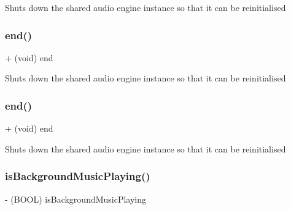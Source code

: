 Shuts down the shared audio engine instance so that it can be reinitialised \mbox{\label{interfaceSimpleAudioEngine_a2750af49fe41ee3fcf3d544f05ef3c73}} 
\subsubsection{\texorpdfstring{end()}{end()}\hspace{0.1cm}{\footnotesize\ttfamily [3/4]}}
{\footnotesize\ttfamily + (void) end \begin{DoxyParamCaption}{ }\end{DoxyParamCaption}}

Shuts down the shared audio engine instance so that it can be reinitialised \mbox{\label{interfaceSimpleAudioEngine_a2750af49fe41ee3fcf3d544f05ef3c73}} 
\subsubsection{\texorpdfstring{end()}{end()}\hspace{0.1cm}{\footnotesize\ttfamily [4/4]}}
{\footnotesize\ttfamily + (void) end \begin{DoxyParamCaption}{ }\end{DoxyParamCaption}}

Shuts down the shared audio engine instance so that it can be reinitialised \mbox{\label{interfaceSimpleAudioEngine_a973125b75501bf21ae82f30ab1aea87c}} 
\subsubsection{\texorpdfstring{is\+Background\+Music\+Playing()}{isBackgroundMusicPlaying()}\hspace{0.1cm}{\footnotesize\ttfamily [1/4]}}
{\footnotesize\ttfamily -\/ (B\+O\+OL) is\+Background\+Music\+Playing \begin{DoxyParamCaption}{ }\end{DoxyParamCaption}}

